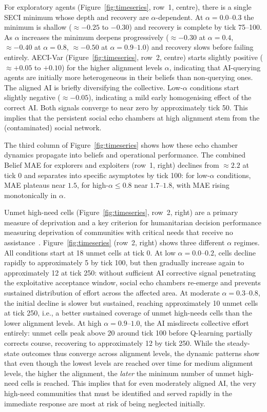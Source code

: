 \documentclass[pdflatex,sn-apa]{sn-jnl}%
\begin{document}
For exploratory agents (Figure~\ref{fig:timeseries}, row~1, centre), there is a single SECI minimum whose depth and recovery are $\alpha$-dependent. At $\alpha = 0.0$--$0.3$ the minimum is shallow ($\approx -0.25$ to $-0.30$) and recovery is complete by tick 75--100. As $\alpha$ increases the minimum deepens progressively
($\approx -0.30$ at $\alpha = 0.4$, $\approx -0.40$ at
$\alpha = 0.8$, $\approx -0.50$ at $\alpha = 0.9$--$1.0$) and recovery slows before failing entirely.
AECI-Var (Figure~\ref{fig:timeseries}, row~2, centre) starts slightly positive ($\approx +0.05$ to $+0.10$) for the higher alignment levels $\alpha$, 
indicating that AI-querying agents are initially 
more heterogeneous in their beliefs than 
non-querying ones. The aligned AI is briefly diversifying the collective. Low-$\alpha$ conditions start slightly negative ($\approx -0.05$), indicating 
a mild early homogenising effect of the correct AI. Both signals converge to near zero by approximately tick 50. This implies that the persistent social echo chambers at high alignment stem from the (contaminated) social network. 

The third column of Figure~\ref{fig:timeseries} shows
how these echo chamber dynamics propagate into beliefs
and operational performance. The combined Belief MAE for explorers and exploiters (row~1, right)
declines from $\approx 2.2$ at tick 0 and separates into specific asymptotes by tick 100: for low-$\alpha$
conditions, MAE plateaus near $1.5$, for high-$\alpha \leq 0.8$ near $1.7$--$1.8$, with MAE rising monotonically in $\alpha$.

Unmet high-need cells (Figure~\ref{fig:timeseries},
row~2, right) are a primary measure of deprivation
and a key criterion for humanitarian decision performance measuring deprivation of communities with critical needs that receive no
assistance~\citep{Wang2017}. Figure~\ref{fig:timeseries} (row~2, right) shows three 
different $\alpha$ regimes. All conditions start
at 18 unmet cells at tick 0. At low
$\alpha = 0.0$--$0.2$, cells decline rapidly to
approximately 5 by tick 100, but then gradually
increase again to approximately 12 at tick 250:
without sufficient AI corrective signal penetrating
the exploitative acceptance window, social echo chambers re-emerge and prevents sustained
distribution of effort across the affected area.
At moderate $\alpha = 0.3$--$0.8$, the initial
decline is slower but sustained, reaching
approximately 10 unmet cells at tick 250, i.e., a better sustained coverage of unmet high-needs cells than the lower alignment levels. At high
$\alpha = 0.9$--$1.0$, the AI misdirects collective effort entirely: unmet cells peak above 20 around tick 100 before Q-learning partially corrects course, recovering to approximately 12 by tick 250. While the steady-state outcomes thus converge across alignment levels, the dynamic patterns show that even though the lowest levels are reached over time for medium alignment levels, the higher the alignment, the \textit{later} the minimum number of unmet high-need cells is reached. This implies that for even moderately aligned AI, the very high-need communities that must be identified and served rapidly in the immediate response are most at risk of being neglected initially. 
\end{document}

